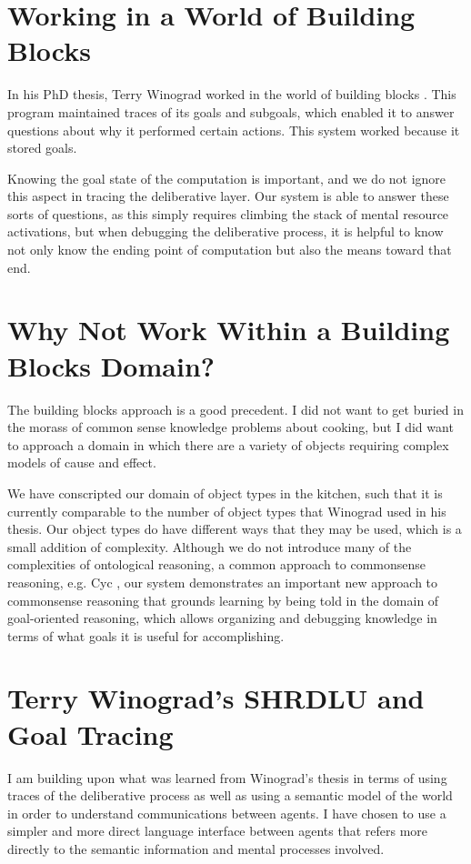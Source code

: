 \section{Working in a World of Building Blocks}

In his PhD thesis, Terry Winograd worked in the world of building
blocks \citep{winograd:1970}.  This program maintained traces of its
goals and subgoals, which enabled it to answer questions about why it
performed certain actions.  This system worked because it stored
goals.

Knowing the goal state of the computation is important, and we do not
ignore this aspect in tracing the deliberative layer.  Our system is
able to answer these sorts of questions, as this simply requires
climbing the stack of mental resource activations, but when debugging
the deliberative process, it is helpful to know not only know the
ending point of computation but also the means toward that end.

\section{Why Not Work Within a Building Blocks Domain?}

The building blocks approach is a good precedent.  I did not want to
get buried in the morass of common sense knowledge problems about
cooking, but I did want to approach a domain in which there are a
variety of objects requiring complex models of cause and effect.

We have conscripted our domain of object types in the kitchen, such
that it is currently comparable to the number of object types that
Winograd used in his thesis.  Our object types do have different ways
that they may be used, which is a small addition of complexity.
Although we do not introduce many of the complexities of ontological
reasoning, a common approach to commonsense reasoning, e.g. Cyc
\citep{lenat:1990}, our system demonstrates an important new approach
to commonsense reasoning that grounds learning by being told in the
domain of goal-oriented reasoning, which allows organizing and
debugging knowledge in terms of what goals it is useful for
accomplishing.

\section{Terry Winograd's SHRDLU and Goal Tracing}

I am building upon what was learned from Winograd's thesis
\citep{winograd:1970} in terms of using traces of the deliberative
process as well as using a semantic model of the world in order to
understand communications between agents.  I have chosen to use a
simpler and more direct language interface between agents that refers
more directly to the semantic information and mental processes
involved.

